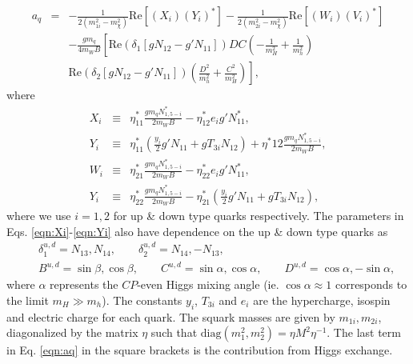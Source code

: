 \begin{enumerate}
\begin{eqnarray}
a_q &=& -\frac{1}{2(m^2_{1i}-m^2_{\chi})} \text{Re}[(X_i)(Y_i)^*] -\frac{1}{2(m^2_{2i}-m^2_{\chi})} \text{Re}[(W_i)(V_i)^*] \nonumber \\
&&-\frac{g m_q}{4 m_W B} \left[ \text{Re}(\delta_1 [gN_{12}-g'N_{11}])DC \left( -\frac{1}{m^2_H}+\frac{1}{m^2_h}\right) \right. \nonumber \\
&&\left. \text{Re}(\delta_2 [gN_{12}-g'N_{11}])\left( \frac{D^2}{m^2_h}+\frac{C^2}{m^2_H}\right)\right],
\label{eqn:aq}
\end{eqnarray}
where
\begin{eqnarray}
X_i &\equiv& \eta^*_{11} \frac{g m_q N^*_{1,5-i}}{2 m_W B} - \eta^*_{12} e_i g' N^*_{11}, \label{eqn:Xi} \\
Y_i &\equiv& \eta^*_{11} \left( \frac{y_i}{2}g' N_{11} + g T_{3i} N_{12} \right) + \eta^*{12} \frac{g m_q N^*_{1,5-i}}{2 m_W B}, \label{eqn:Yi} \\
W_i &\equiv& \eta^*_{21} \frac{g m_q N^*_{1,5-i}}{2 m_W B} - \eta^*_{22} e_i g' N^*_{11}, \label{eqn:Wi} \\
Y_i &\equiv& \eta^*_{22} \frac{g m_q N^*_{1,5-i}}{2 m_W B} - \eta^*_{21} \left( \frac{y_i}{2}g' N_{11} + g T_{3i} N_{12} \right), \label{eqn:Yi}
\end{eqnarray}
where we use $i=1,2$ for up \& down type quarks respectively. The parameters in Eqs. \ref{eqn:Xi}-\ref{eqn:Yi} also have dependence on the up \& down type quarks as
\begin{eqnarray}
&&\delta^{u,d}_1 = N_{13},N_{14},\qquad \delta^{u,d}_2 = N_{14},-N_{13}, \nonumber \\
&&B^{u,d}=\sin \beta, \cos \beta,\qquad C^{u,d}=\sin \alpha, \cos \alpha, \qquad D^{u,d}=\cos \alpha, -\sin \alpha,
\end{eqnarray}
where $\alpha$ represents the $CP$-even Higgs mixing angle (ie. $\cos \alpha \approx 1$ corresponds to the limit $m_H \gg m_h$). The constants $y_i$, $T_{3i}$ and $e_i$ are the hypercharge, isospin and electric charge for each quark. The squark masses are given by $m_{1i},m_{2i}$, diagonalized by the matrix $\eta$ such that $\text{diag}(m^2_1,m^2_2)=\eta M^2 \eta^{-1}$. The last term in Eq. \ref{eqn:aq} in the square brackets is the contribution from Higgs exchange.
\begin{center}
\end{center}
\end{enumerate}
